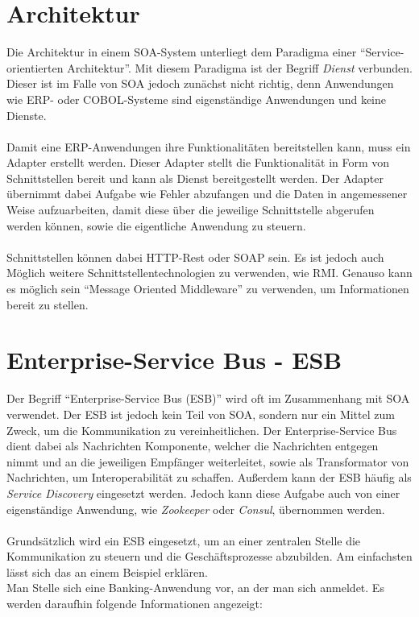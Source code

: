 \section{Architektur}
\label{sec:SoaArchitektur}
Die Architektur in einem SOA-System unterliegt dem Paradigma einer "`Service-orientierten Architektur"'. Mit diesem Paradigma ist der Begriff \textit{Dienst} verbunden. Dieser ist im Falle von SOA jedoch zunächst nicht richtig, denn Anwendungen wie ERP- oder COBOL-Systeme sind eigenständige Anwendungen und keine Dienste.
\\\\
Damit eine ERP-Anwendungen ihre Funktionalitäten bereitstellen kann, muss ein Adapter erstellt werden. Dieser Adapter stellt die Funktionalität in Form von Schnittstellen bereit und kann als Dienst bereitgestellt werden. Der Adapter übernimmt dabei Aufgabe wie Fehler abzufangen und die Daten in angemessener Weise aufzuarbeiten, damit diese über die jeweilige Schnittstelle abgerufen werden können, sowie die eigentliche Anwendung zu steuern.
\\\\
Schnittstellen können dabei HTTP-Rest oder SOAP sein. Es ist jedoch auch Möglich weitere Schnittstellentechnologien zu verwenden, wie RMI. Genauso kann es möglich sein "`Message Oriented Middleware"' zu verwenden, um Informationen bereit zu stellen.

\section{Enterprise-Service Bus - ESB}
\label{sec:esb}
Der Begriff "`Enterprise-Service Bus (ESB)"' wird oft im Zusammenhang mit SOA verwendet. Der ESB ist jedoch kein Teil von SOA, sondern nur ein Mittel zum Zweck, um die Kommunikation zu vereinheitlichen. Der Enterprise-Service Bus dient dabei als Nachrichten Komponente, welcher die Nachrichten entgegen nimmt und an die jeweiligen Empfänger weiterleitet, sowie als Transformator von Nachrichten, um Interoperabilität zu schaffen. Außerdem kann der ESB häufig als \textit{Service Discovery} eingesetzt werden. Jedoch kann diese Aufgabe auch von einer eigenständige Anwendung, wie \textit{Zookeeper} oder \textit{Consul}, übernommen werden.
\\\\
Grundsätzlich wird ein ESB eingesetzt, um an einer zentralen Stelle die Kommunikation zu steuern und die Geschäftsprozesse abzubilden. Am einfachsten lässt sich das an einem Beispiel erklären.
\\
Man Stelle sich eine Banking-Anwendung vor, an der man sich anmeldet. Es werden daraufhin folgende Informationen angezeigt:

